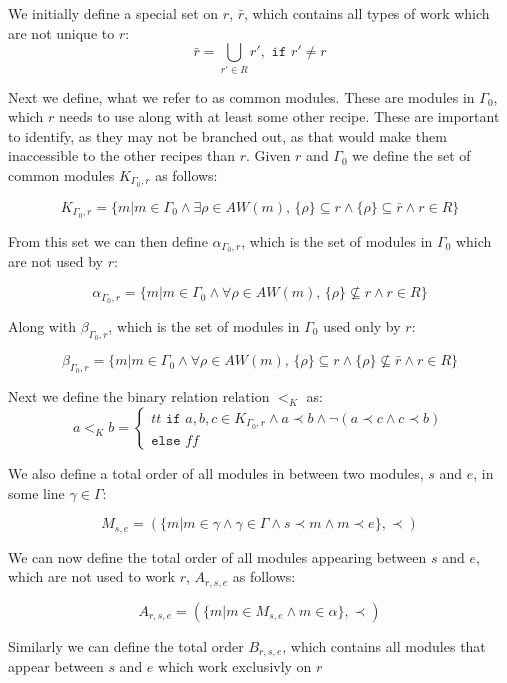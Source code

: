 We initially define a special set on $r$, $\bar{r}$, which contains all types of work which are not unique to $r$:
\[\bar{r} = \bigcup_{r' \in R}r', \texttt{ if } r' \neq r\]

Next we define, what we refer to as common modules. These are modules in $\Gamma_0$, which $r$ needs to use along with at least some other recipe. These are important to identify, as they may not be branched out, as that would make them inaccessible to the other recipes than $r$.  Given $r$ and $\Gamma_0$ we define the set of common modules $K_{\Gamma_0,r}$ as follows:

\[K_{\Gamma_0 ,r} = \{m | m \in \Gamma_0  \land \exists \rho \in AW(m),\, \{\rho\} \subseteq r \land \{\rho\} \subseteq \bar{r} \land r \in R\}\]

From this set we can then define $\alpha_{\Gamma_0 ,r}$, which is the set of modules in $\Gamma_0$ which are not used by $r$: 

\[\alpha_{\Gamma_0 ,r}  = \{m |m \in \Gamma_0 \land \forall \rho \in AW(m),\, \{\rho\} \nsubseteq r \land r \in R\}\]

Along with $\beta_{\Gamma_0 ,r}$, which is the set of modules in $\Gamma_0$ used only by $r$:

\[\beta_{\Gamma_0 ,r}  = \{m  | m \in \Gamma_0 \land \forall \rho \in AW(m),\, \{\rho\} \subseteq r \land \{\rho\} \nsubseteq \bar{r} \land r \in R\}\]

Next we define the binary relation relation $<_K$ as:
\[a <_K b = \left\{\begin{matrix}
tt \texttt{ if } a,b,c \in K_{\Gamma_0 ,r} \land a \prec b \land \lnot (a \prec c \land c \prec b) \\ \texttt{else } ff
\end{matrix}\right.\]

We also define a total order of all modules in between two modules, $s$ and $e$, in some line $\gamma \in \Gamma$:

\[M_{s,e} = (\{m | m \in \gamma \land \gamma \in \Gamma \land s \prec m \land m \prec e\}, \prec)\]

We can now define the total order of all modules appearing between $s$ and $e$, which are not used to work $r$, $A_{r,s,e}$ as follows: 

\[A_{r,s,e} = (\{m |m \in M_{s,e} \land m \in \alpha\}, \prec)\]

Similarly we can define the total order $B_{r,s,e}$, which contains all modules that appear between $s$ and $e$ which work exclusivly on $r$

